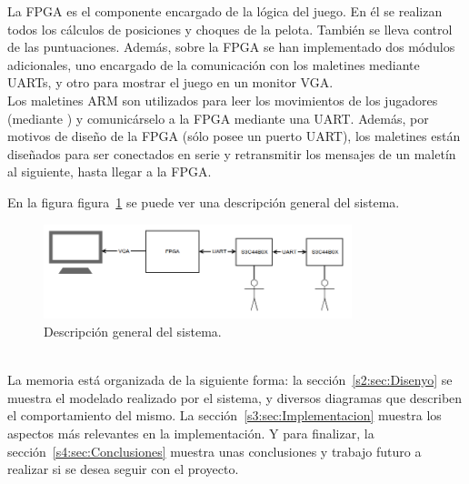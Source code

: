 La FPGA es el componente encargado de la lógica del juego. En él se
realizan todos los cálculos de posiciones y choques de la pelota. También
se lleva control de las puntuaciones. Además, sobre la FPGA se han
implementado dos módulos adicionales, uno encargado de la comunicación con
los maletines mediante UARTs, y otro para mostrar el juego en un monitor
VGA.\\
Los maletines ARM son utilizados para leer los movimientos de los jugadores
(mediante ) y comunicárselo a la FPGA
mediante una UART. Además, por motivos de diseño de la FPGA (sólo posee un
puerto UART), los maletines están diseñados para ser conectados en serie y
retransmitir los mensajes de un maletín al siguiente, hasta llegar a la
FPGA. 

En la figura figura~\ref{s1:fig:vista_general_sistema} se puede ver una
descripción general del sistema.\\

\begin{figure}[h]
  \centering
  \includegraphics[width=0.8\textwidth]{images/descripcion_general.png}
  \caption{Descripción general del sistema.}
  \label{s1:fig:vista_general_sistema}
\end{figure}


\\
La memoria está organizada de la siguiente forma:
la sección~\ref{s2:sec:Disenyo} se muestra el modelado realizado por el
sistema, y diversos diagramas que describen el comportamiento del mismo. La
sección~\ref{s3:sec:Implementacion} muestra los aspectos más relevantes en
la implementación. Y para finalizar, la sección~\ref{s4:sec:Conclusiones}
muestra unas conclusiones y trabajo futuro a realizar si se desea seguir
con el proyecto.








%
%



